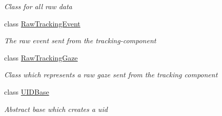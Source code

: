 \begin{DoxyCompactItemize}
\begin{DoxyCompactList}\small\item\em Class for all raw data \end{DoxyCompactList}\item 
class \hyperlink{class_web_analyzer_1_1_models_1_1_base_1_1_raw_tracking_event}{Raw\+Tracking\+Event}
\begin{DoxyCompactList}\small\item\em The raw event sent from the tracking-\/component \end{DoxyCompactList}\item 
class \hyperlink{class_web_analyzer_1_1_models_1_1_base_1_1_raw_tracking_gaze}{Raw\+Tracking\+Gaze}
\begin{DoxyCompactList}\small\item\em Class which represents a raw gaze sent from the tracking component \end{DoxyCompactList}\item 
class \hyperlink{class_web_analyzer_1_1_models_1_1_base_1_1_u_i_d_base}{U\+I\+D\+Base}
\begin{DoxyCompactList}\small\item\em Abstract base which creates a uid \end{DoxyCompactList}\end{DoxyCompactItemize}
